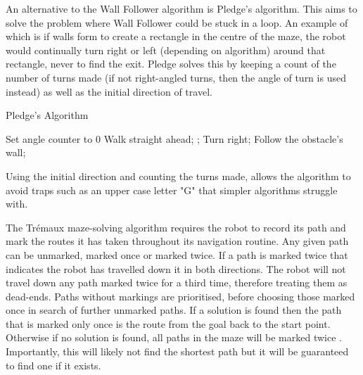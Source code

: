 An alternative to the Wall Follower algorithm is Pledge's algorithm. This
aims to solve the problem where Wall Follower could be stuck in a loop. An 
example of which is if walls form to create a rectangle in the centre of 
the maze, the robot would continually turn right or left (depending on
algorithm) around that rectangle, never to find the exit. Pledge solves this
by keeping a count of the number of turns made (if not right-angled turns,
then the angle of turn is used instead) as well as the initial direction of
travel. \cite{klein2011pledge}

\begin{algorithm}
\caption{Pledge's Algorithm}
\begin{algorithmic}
\STATE Set angle counter to 0
\REPEAT
\REPEAT
\STATE Walk straight ahead;
;
\STATE Turn right;
\REPEAT
\STATE Follow the obstacle's wall;
\end{algorithmic}
\end{algorithm}
Using the initial direction and counting the turns made, allows the 
algorithm to avoid traps such as an upper case letter "G" that simpler 
algorithms struggle with.

The Trémaux maze-solving algorithm requires the robot to record its 
path and mark the routes it has taken throughout its navigation routine. Any 
given path  can be unmarked, marked once or marked twice. If a path is marked 
twice that indicates the robot has travelled down it in both directions. The 
robot will not travel down any path marked twice for a third time, therefore 
treating them as dead-ends. Paths without markings are prioritised, before 
choosing those marked once in search of further unmarked paths. If a 
solution is found then the path that is marked only once is the route 
from the goal back to the start point. Otherwise if no solution is found,
all paths in the maze will be marked twice \cite{even2011graph}.
Importantly, this will likely not find the shortest path but it will be 
guaranteed to find one if it exists.

